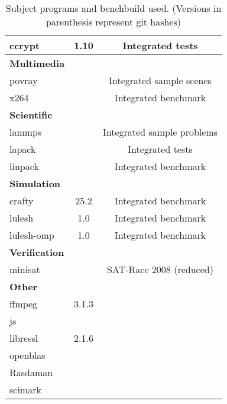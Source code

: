 \begin{table}[H]
{\begin{minipage}{\textwidth}
\begin{tabularx}{\textwidth}{lcC}
                ccrypt & 1.10 & Integrated tests\\
                \midrule
                \textbf{Multimedia}\\
                povray &  & Integrated sample scenes\\
                x264 &  & Integrated benchmark\\
                \midrule
                \textbf{Scientific}\\
                lammps &  & Integrated sample problems\\
                lapack & & Integrated tests\\
                linpack & & Integrated benchmark\\
                \midrule
                \textbf{Simulation}\\
                crafty & 25.2 & Integrated benchmark\\
                lulesh & 1.0 & Integrated benchmark\\
                lulesh-omp & 1.0 & Integrated benchmark\\
                \midrule
                \textbf{Verification}\\
                minisat &  & SAT-Race 2008 (reduced)\\
                \midrule
                \textbf{Other}\\
                ffmpeg & 3.1.3\\
                js\\
                libressl & 2.1.6\\
                openblas & \\
                Rasdaman & \\
                scimark  & \\
                \bottomrule
            \end{tabularx}
            \caption[Subject programs]{Subject programs and benchbuild used. (Versions in parenthesis represent git hashes)}
            \label{tab:subjectPrograms}
        \end{minipage}
    }
\end{table}

